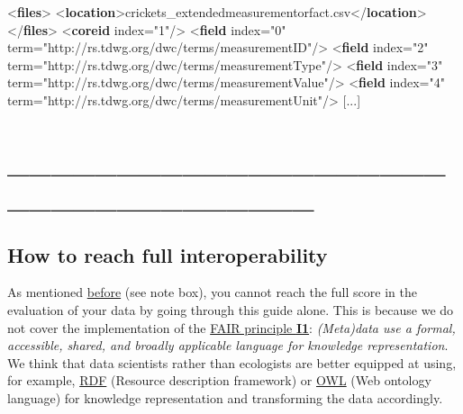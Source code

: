 \documentclass[
]{book}
\newenvironment{Shaded}{\begin{snugshade}}{\end{snugshade}}
\newcommand{\KeywordTok}[1]{\textcolor[rgb]{0.13,0.29,0.53}{\textbf{#1}}}
\newcommand{\NormalTok}[1]{#1}
\newcommand{\OtherTok}[1]{\textcolor[rgb]{0.56,0.35,0.01}{#1}}
\newcommand{\StringTok}[1]{\textcolor[rgb]{0.31,0.60,0.02}{#1}}
\begin{document}
\begin{Shaded}
\begin{Highlighting}[]
\NormalTok{    \textless{}}\KeywordTok{files}\NormalTok{\textgreater{}}
\NormalTok{      \textless{}}\KeywordTok{location}\NormalTok{\textgreater{}crickets\_extendedmeasurementorfact.csv\textless{}/}\KeywordTok{location}\NormalTok{\textgreater{}}
\NormalTok{    \textless{}/}\KeywordTok{files}\NormalTok{\textgreater{}}
\NormalTok{    \textless{}}\KeywordTok{coreid}\OtherTok{ index=}\StringTok{"1"}\NormalTok{/\textgreater{}}
\NormalTok{    \textless{}}\KeywordTok{field}\OtherTok{ index=}\StringTok{"0"}\OtherTok{ term=}\StringTok{"http://rs.tdwg.org/dwc/terms/measurementID"}\NormalTok{/\textgreater{}}
\NormalTok{    \textless{}}\KeywordTok{field}\OtherTok{ index=}\StringTok{"2"}\OtherTok{ term=}\StringTok{"http://rs.tdwg.org/dwc/terms/measurementType"}\NormalTok{/\textgreater{}}
\NormalTok{    \textless{}}\KeywordTok{field}\OtherTok{ index=}\StringTok{"3"}\OtherTok{ term=}\StringTok{"http://rs.tdwg.org/dwc/terms/measurementValue"}\NormalTok{/\textgreater{}}
\NormalTok{    \textless{}}\KeywordTok{field}\OtherTok{ index=}\StringTok{"4"}\OtherTok{ term=}\StringTok{"http://rs.tdwg.org/dwc/terms/measurementUnit"}\NormalTok{/\textgreater{}}
\NormalTok{    [...]}
\end{Highlighting}
\end{Shaded}

\hypertarget{part-__________________________________}{%
\part*{\_\_\_\_\_\_\_\_\_\_\_\_\_\_\_\_\_\_\_\_\_\_\_\_\_\_\_\_\_\_\_\_\_\_}\label{part-__________________________________}}

\hypertarget{fully-interoperable}{%
\chapter{How to reach full interoperability}\label{fully-interoperable}}

As mentioned \protect\hyperlink{evaluation}{before} (see note box), you cannot reach the full score in the evaluation of your data by going through this guide alone. This is because we do not cover the implementation of the \href{https://www.go-fair.org/fair-principles/i1-metadata-use-formal-accessible-shared-broadly-applicable-language-knowledge-representation/}{FAIR principle \textbf{I1}}: \emph{(Meta)data use a formal, accessible, shared, and broadly applicable language for knowledge representation}. We think that data scientists rather than ecologists are better equipped at using, for example, \protect\hyperlink{RDF}{RDF} (Resource description framework) or \protect\hyperlink{OWL}{OWL} (Web ontology language) for knowledge representation and transforming the data accordingly.
\end{document}
